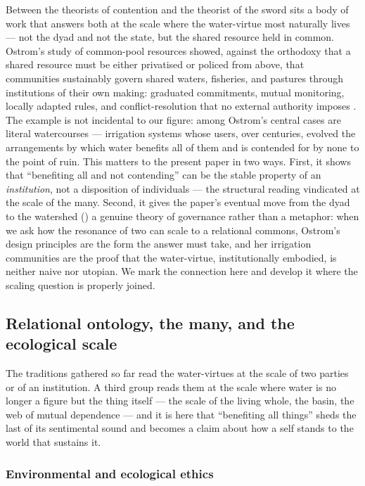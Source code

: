 Between the theorists of contention and the theorist of the sword sits a body of work that answers both at the scale where the water-virtue most naturally lives --- not the dyad and not the state, but the shared resource held in common. Ostrom's study of common-pool resources showed, against the orthodoxy that a shared resource must be either privatised or policed from above, that communities sustainably govern shared waters, fisheries, and pastures through institutions of their own making: graduated commitments, mutual monitoring, locally adapted rules, and conflict-resolution that no external authority imposes \parencite{ostrom1990}. The example is not incidental to our figure: among Ostrom's central cases are literal watercourses --- irrigation systems whose users, over centuries, evolved the arrangements by which water benefits all of them and is contended for by none to the point of ruin. This matters to the present paper in two ways. First, it shows that ``benefiting all and not contending'' can be the stable property of an \emph{institution}, not a disposition of individuals --- the structural reading vindicated at the scale of the many. Second, it gives the paper's eventual move from the dyad to the watershed () a genuine theory of governance rather than a metaphor: when we ask how the resonance of two can scale to a relational commons, Ostrom's design principles are the form the answer must take, and her irrigation communities are the proof that the water-virtue, institutionally embodied, is neither naive nor utopian. We mark the connection here and develop it where the scaling question is properly joined.


\subsection{Relational ontology, the many, and the ecological scale}
\label{p20:sub:review-relational}

The traditions gathered so far read the water-virtues at the scale of two parties or of an institution. A third group reads them at the scale where water is no longer a figure but the thing itself --- the scale of the living whole, the basin, the web of mutual dependence --- and it is here that ``benefiting all things'' sheds the last of its sentimental sound and becomes a claim about how a self stands to the world that sustains it.

\subsubsection{Environmental and ecological ethics}
\label{p20:ssub:review-eco}

